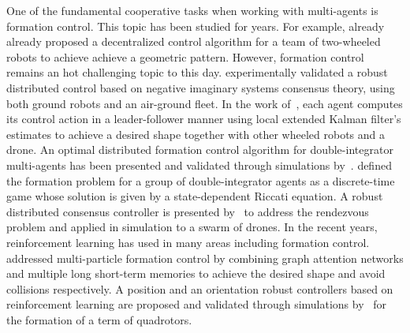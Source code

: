 \documentclass{ifacconf}
\begin{document}
One of the fundamental cooperative tasks when working with multi-agents is formation
control.
This topic has been studied for years.
For example, already~\cite{LEE200985} already proposed
a decentralized control algorithm for a team of two-wheeled robots 
to achieve achieve a geometric pattern.
However, formation control remains an hot challenging topic to this day.
\cite{TRAN2021100117} experimentally validated a robust distributed control 
based on negative imaginary systems consensus theory, using both ground robots and
an air-ground fleet.
In the work of~\cite{GULER2023105492}, each agent computes its control action 
in a leader-follower manner using local extended Kalman filter's estimates to 
achieve a desired shape together with other wheeled robots and a drone.
An optimal distributed formation control algorithm for double-integrator multi-agents
has been presented and validated through simulations by~\cite{Huang2023}.
\cite{Aditya2023} defined the formation problem for a group of double-integrator agents 
as a discrete-time game whose solution is given by a state-dependent Riccati equation.
A robust distributed consensus controller is presented by~\cite{Restrepo2023}
to address the rendezvous problem and applied in simulation to a swarm of drones.
In the recent years, reinforcement learning has used in many areas including 
formation control. 
\cite{WANG20208150} addressed multi-particle formation control by combining 
graph attention networks and multiple long short-term memories to achieve the 
desired shape and avoid collisions respectively.
A position and an orientation robust controllers based on reinforcement learning 
are proposed and validated through simulations by~\cite{Zhong2025} for the formation 
of a term of quadrotors.
\end{document}
